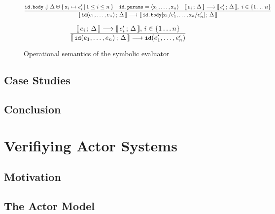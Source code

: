 \begin{figure}[htb]
\begin{framed}
\begin{equation}
\dfrac{
 \texttt{\small{id.body}} \Downarrow \Delta \uplus \{\,\texttt{\small{x}}_i \mapsto e_i'\,|\, 1 \leq i \leq n\,\}
 \quad
 \texttt{\small{id.params}} = \langle \texttt{\small{x}}_1, \ldots, \texttt{\small{x}}_n \rangle
 \quad
 \llbracket\, e_i\,;\, \Delta\, \rrbracket \longrightarrow \llbracket\, e_i'\,;\, \Delta\, \rrbracket,\  i \in \{1 \ldots n\}
}{
  \llbracket\, \texttt{\small{id}}(e_1,\ldots,e_n)\,;\, \Delta\, \rrbracket \longrightarrow
  \llbracket\, \texttt{\small{id.body}}[\texttt{\small{x}}_1/e_1',\ldots,\texttt{\small{x}}_n/e_n']\,;\, \Delta\, \rrbracket
}
\label{fig:symbolicsem:fi2}
\end{equation}

\begin{equation}
\dfrac{
 \llbracket\, e_i\,;\, \Delta\, \rrbracket \longrightarrow \llbracket\, e_i'\,;\, \Delta\, \rrbracket,\, i \in \{1 \ldots n\}
}{
  \llbracket\, \texttt{\small{id}}(e_1,\ldots,e_n)\,;\, \Delta\, \rrbracket \longrightarrow
  \texttt{\small{id}}(e_1',\ldots,e_n')
}
\label{fig:symbolicsem:fi3}
\end{equation}

\end{framed}
\vspace{-10pt}
\caption{Operational semantics of the symbolic evaluator \label{fig:symbolicsem}}
\end{figure}

\subsection{Case Studies}


\subsection{Conclusion}



\clearpage
\section{Verifiying Actor Systems}
\label{actors}

\subsection{Motivation}


\subsection{The Actor Model}

